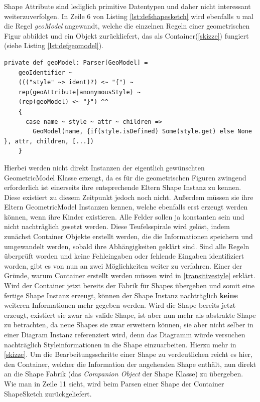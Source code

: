Shape Attribute sind lediglich primitive Datentypen und daher nicht interessant weiterzuverfolgen. In Zeile 6 von Listing \ref{lst:defshapesketch} wird ebenfalls \textit{n} mal die Regel \textit{geoModel} angewandt, welche die einzelnen Regeln einer geometrischen Figur abbildet und ein Objekt zurückliefert, das als Container(\ref{skizze}) fungiert (siehe Listing \ref{lst:defgeomodel}).
\begin{lstlisting}[style=scala, caption = {Auszug aus Code Regel zum Parsen geometrischer Figuren}, label = {lst:defgeomodel}]
private def geoModel: Parser[GeoModel] =
    geoIdentifier ~
    ((("style" ~> ident)?) <~ "{") ~
    rep(geoAttribute|anonymousStyle) ~
    (rep(geoModel) <~ "}") ^^
    {
      case name ~ style ~ attr ~ children =>
        GeoModel(name, {if(style.isDefined) Some(style.get) else None }, attr, children, [...])
    }
\end{lstlisting}Hierbei werden nicht direkt Instanzen der eigentlich gewünschten GeometricModel Klasse erzeugt, da es für die geometrischen Figuren zwingend erforderlich ist einerseits ihre entsprechende Eltern Shape Instanz zu kennen. Diese existiert zu diesem Zeitpunkt jedoch noch nicht. Außerdem müssen sie ihre Eltern GeometricModel Instanzen kennen, welche ebenfalls erst erzeugt werden können, wenn ihre Kinder existieren. Alle Felder sollen ja konstanten sein und nicht nachträglich gesetzt werden. Diese Teufelsspirale wird gelöst, indem zunächst Container Objekte erstellt werden, die die Informationen speichern und umgewandelt werden, sobald ihre Abhängigkeiten geklärt sind. Sind alle Regeln überprüft worden und keine Fehleingaben oder fehlende Eingaben identifiziert worden, gibt es von nun an zwei Möglichkeiten weiter zu verfahren. Einer der Gründe, warum Container erstellt werden müssen wird in \ref{transitivestyle} erklärt. Wird der Container jetzt bereits der Fabrik für Shapes übergeben und somit eine fertige Shape Instanz erzeugt, können der Shape Instanz nachträglich \textbf{keine} weiteren Informationen mehr gegeben werden.
Wird die Shape bereits jetzt erzeugt, existiert sie zwar als valide Shape, ist aber nun mehr als abstrakte Shape zu betrachten, da neue Shapes sie zwar erweitern können, sie aber nicht selber in einer Diagram Instanz referenziert wird, denn das Diagramm würde versuchen nachträglich Styleinformationen in die Shape einzuarbeiten. Hierzu mehr in \ref{skizze}. Um die Bearbeitungsschritte einer Shape zu verdeutlichen reicht es hier, den Container, welcher die Information der angehenden Shape enthält, nun direkt an die Shape Fabrik (das \textit{Companion Object} der Shape Klasse) zu übergeben. Wie man in Zeile 11 sieht, wird beim Parsen einer Shape der Container ShapeSketch zurückgeliefert.
